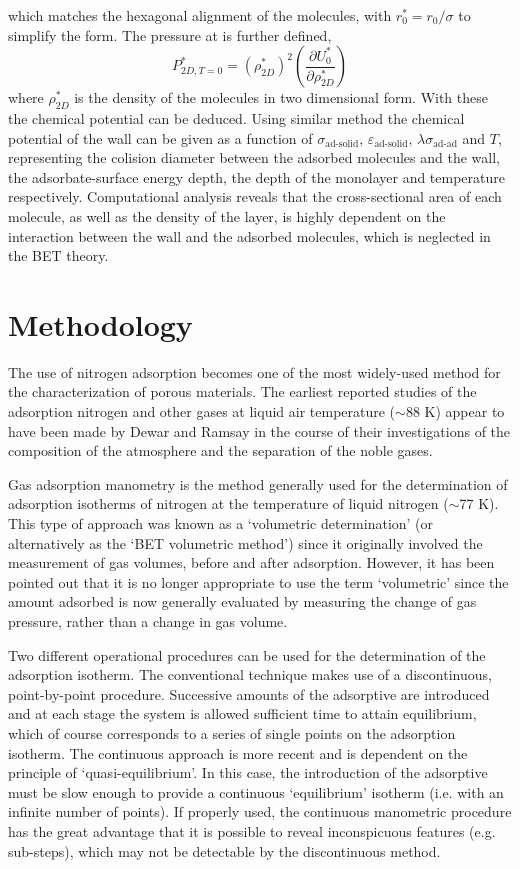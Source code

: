 \documentclass[%
 reprint,
 amsmath,amssymb,
 aps,
10.5pt,
]{revtex4-1}
\begin{document}
which matches the hexagonal alignment of the molecules, with $r_0^* = r_0/\sigma$ to simplify the form. The pressure at is further defined,
\begin{equation}
	P _ { 2 D , T = 0 } ^ { * } = \left( \rho _ { 2 D } ^ { * } \right) ^ { 2 } \left( \frac { \partial U _ { 0 } ^ { * } } { \partial \rho _ { 2 D } ^ { * } } \right)
\end{equation}
where $\rho_{2D}^*$ is the density of the molecules in two dimensional form. With these the chemical potential can be deduced. Using similar method the chemical potential of the wall can be given as a function of $\sigma_\text{ad-solid},\, \varepsilon_\text{ad-solid},\,\lambda\sigma_\text{ad-ad}$ and $T$, representing the colision diameter between the adsorbed molecules and the wall, the adsorbate-surface energy depth, the depth of the monolayer and temperature respectively. Computational analysis reveals that the cross-sectional area of each molecule, as well as the density of the layer, is highly dependent on the interaction between the wall and the adsorbed molecules, which is neglected in the BET theory.


\section{Methodology}
The use of nitrogen adsorption becomes one of the most widely-used method for the characterization of porous materials. The earliest reported studies of the adsorption nitrogen and other gases at liquid air temperature ($\sim$88 K) appear to have been made by Dewar and Ramsay in the course of their investigations of the composition of the atmosphere and the separation of the noble gases.\cite{SING20013}

Gas adsorption manometry is the method generally
used for the determination of adsorption
isotherms of nitrogen at the temperature of liquid
nitrogen ($\sim$77 K). This type of approach was
known as a `volumetric determination' (or alternatively
as the `BET volumetric method') since it
originally involved the measurement of gas volumes,
before and after adsorption. However, it
has been pointed out that it is no longer
appropriate to use the term `volumetric' since the
amount adsorbed is now generally evaluated by
measuring the change of gas pressure, rather than
a change in gas volume.

Two different operational procedures can be
used for the determination of the adsorption
isotherm. The conventional technique makes use
of a discontinuous, point-by-point procedure.
Successive amounts of the adsorptive are introduced
and at each stage the system is allowed
sufficient time to attain equilibrium, which of
course corresponds to a series of single points
on the adsorption isotherm. The continuous approach
is more recent and is dependent on the
principle of `quasi-equilibrium'. In this
case, the introduction of the adsorptive must be
slow enough to provide a continuous `equilibrium'
isotherm (i.e. with an infinite number of
points). If properly used, the continuous manometric
procedure has the great advantage that it
is possible to reveal inconspicuous features (e.g.
sub-steps), which may not be detectable by the
discontinuous method.
\end{document}
